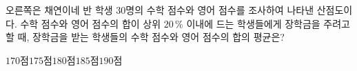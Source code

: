 \noindent\begin{minipage}[t]{0.58\linewidth}\vspace{0pt}\raggedright 오른쪽은 채연이네 반 학생 $30$명의 수학 점수와 영어 점수를 조사하여 나타낸 산점도이다. 수학 점수와 영어 점수의 합이 상위 $20\,\%$ 이내에 드는 학생들에게 장학금을 주려고 할 때, 장학금을 받는 학생들의 수학 점수와 영어 점수의 합의 평균은?\end{minipage}\hfill\begin{minipage}[t]{0.4\linewidth}\vspace{0pt}\centering \resizebox{\ifdim\width>\linewidth\linewidth\else\width\fi}{!}{}\end{minipage}\par
\begin{choices32}{$170$점}{$175$점}{$180$점}{$185$점}{$190$점}\end{choices32}
